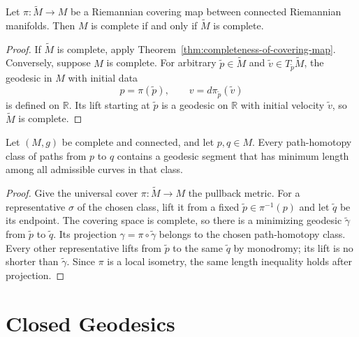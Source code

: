 \begin{corollary}
\label{cor:complete-iff-covering-complete}
\leanok
{}
Let $\pi\colon\widetilde M\to M$ be a Riemannian covering map between
connected Riemannian manifolds. Then $M$ is complete if and only if
$\widetilde M$ is complete.
\end{corollary}

\begin{proof}
\leanok
\sketch If $\widetilde M$ is complete, apply
Theorem~\ref{thm:completeness-of-covering-map}. Conversely, suppose $M$ is
complete. For arbitrary $\widetilde p\in\widetilde M$ and
$\widetilde v\in T_{\widetilde p}\widetilde M$, the geodesic in $M$ with
initial data
\[
p=\pi(\widetilde p),
\qquad v=d\pi_{\widetilde p}(\widetilde v)
\]
is defined on $\mathbb R$. Its lift starting at $\widetilde p$ is a geodesic
on $\mathbb R$ with initial velocity $\widetilde v$, so $\widetilde M$ is
complete.
\end{proof}

\begin{proposition}
\label{prop:path-homotopy-contains-minimizing-geodesic}
Let $(M,g)$ be complete and connected, and let $p,q\in M$. Every
path-homotopy class of paths from $p$ to $q$ contains a geodesic segment that
has minimum length among all admissible curves in that class.
\end{proposition}

\begin{proof}
\sketch Give the universal cover $\pi\colon\widetilde M\to M$ the pullback
metric. For a representative $\sigma$ of the chosen class, lift it from a
fixed $\widetilde p\in\pi^{-1}(p)$ and let $\widetilde q$ be its endpoint.
The covering space is complete, so there is a minimizing geodesic
$\widetilde\gamma$ from $\widetilde p$ to $\widetilde q$. Its projection
$\gamma=\pi\circ\widetilde\gamma$ belongs to the chosen path-homotopy class.
Every other representative lifts from $\widetilde p$ to the same
$\widetilde q$ by monodromy; its lift is no shorter than
$\widetilde\gamma$. Since $\pi$ is a local isometry, the same length inequality
holds after projection.
\end{proof}

\section{Closed Geodesics}

